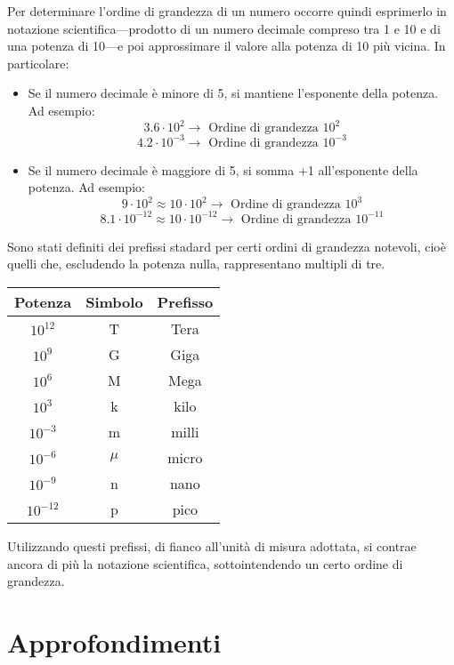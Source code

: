 \noindent Per determinare l'ordine di grandezza di un numero occorre quindi esprimerlo in
notazione scientifica—prodotto di un numero decimale compreso tra 1 e 10 e di
una potenza di 10—e poi approssimare il valore alla potenza di 10 più vicina.
In particolare:
\begin{itemize}
    \item Se il numero decimale è minore di 5, si mantiene l'esponente della
    potenza. Ad esempio:
    \[ 3.6 \cdot 10^2 \to \text{ Ordine di grandezza } 10^2 \]
    \[ 4.2 \cdot 10^{-3} \to \text{ Ordine di grandezza } 10^{-3} \]

    \item Se il numero decimale è maggiore di 5, si somma +1 all'esponente della
    potenza. Ad esempio:
    \[ 9 \cdot 10^2 \approx 10 \cdot 10^2 \to \text{ Ordine di grandezza } 10^3 \]
    \[ 8.1 \cdot 10^{-12} \approx 10 \cdot 10^{-12} \to \text{ Ordine di grandezza } 10^{-11} \]
\end{itemize}

\noindent Sono stati definiti dei prefissi stadard per certi ordini di grandezza notevoli,
cioè quelli che, escludendo la potenza nulla, rappresentano multipli di tre.

\begin{center}
    \begin{tabular}{c|c|c}
        Potenza   & Simbolo & Prefisso\\
        \hline
        $10^{12}$  & T       & Tera\\
        $10^{9}$   & G       & Giga\\
        $10^{6}$   & M       & Mega\\
        $10^{3}$   & k       & kilo\\
        $10^{-3}$  & m       & milli\\
        $10^{-6}$  & $\mu$   & micro\\
        $10^{-9}$  & n       & nano\\
        $10^{-12}$ & p       & pico\\
    \end{tabular}
\end{center}
Utilizzando questi prefissi, di fianco all'unità di misura adottata, si contrae
ancora di più la notazione scientifica, sottointendendo un certo ordine di
grandezza.


\section{Approfondimenti}

